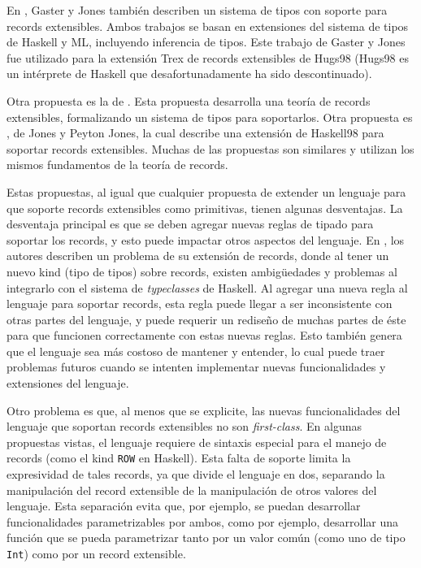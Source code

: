 En \cite{Gaster96apolymorphic}, Gaster y Jones también describen un sistema de tipos con soporte para records extensibles. Ambos trabajos se basan en extensiones del sistema de tipos de Haskell y ML, incluyendo inferencia de tipos. Este trabajo de Gaster y Jones fue utilizado para la extensión Trex de records extensibles de Hugs98 \cite{TrexHugsExtension} (Hugs98 es un intérprete de Haskell que desafortunadamente ha sido descontinuado).

Otra propuesta es la de \cite{Cardelli:1990:OR:101514.101515}. Esta propuesta desarrolla una teoría de records extensibles, formalizando un sistema de tipos para soportarlos. Otra propuesta es \cite{Jones99lightweightextensible}, de Jones y Peyton Jones, la cual describe una extensión de Haskell98 para soportar records extensibles. Muchas de las propuestas son similares y utilizan los mismos fundamentos de la teoría de records.

Estas propuestas, al igual que cualquier propuesta de extender un lenguaje para que soporte records extensibles como primitivas, tienen algunas desventajas. La desventaja principal es que se deben agregar nuevas reglas de tipado para soportar los records, y esto puede impactar otros aspectos del lenguaje. En \cite{Jones99lightweightextensible}, los autores describen un problema de su extensión de records, donde al tener un nuevo kind (tipo de tipos) sobre records, existen ambigüedades y problemas al integrarlo con el sistema de \textit{typeclasses} de Haskell. Al agregar una nueva regla al lenguaje para soportar records, esta regla puede llegar a ser inconsistente con otras partes del lenguaje, y puede requerir un rediseño de muchas partes de éste para que funcionen correctamente con estas nuevas reglas. Esto también genera que el lenguaje sea más costoso de mantener y entender, lo cual puede traer problemas futuros cuando se intenten implementar nuevas funcionalidades y extensiones del lenguaje. 

Otro problema es que, al menos que se explicite, las nuevas funcionalidades del lenguaje que soportan records extensibles no son \textit{first-class}. En algunas propuestas vistas, el lenguaje requiere de sintaxis especial para el manejo de records (como el kind \texttt{ROW} en Haskell). Esta falta de soporte limita la expresividad de tales records, ya que divide el lenguaje en dos, separando la manipulación del record extensible de la manipulación de otros valores del lenguaje. Esta separación evita que, por ejemplo, se puedan desarrollar funcionalidades parametrizables por ambos, como por ejemplo, desarrollar una función que se pueda parametrizar tanto por un valor común (como uno de tipo \texttt{Int}) como por un record extensible.

